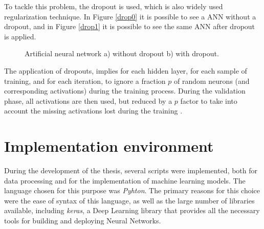To tackle this problem, the dropout is used, which is also widely used regularization technique. In Figure \ref{drop0} it is possible to see a \ac{ANN} without a dropout, and in Figure \ref{drop1} it is possible to see the same \ac{ANN} after dropout is applied.

\begin{figure}[h!]
\captionsetup[subfigure]{position=b}
\centering
\label{fig:drop}
\hspace{0.05\textwidth}
\caption{Artificial neural network a) without dropout b) with dropout.}
\end{figure}

The application of dropouts, implies for each hidden layer, for each sample of training, and for each iteration, to ignore a fraction $p$ of random neurons (and corresponding activations) during the training process. During the validation phase, all activations are then used, but reduced by a $p$ factor to take into account the missing activations lost during the training \cite{drop0}.

\section{Implementation environment}\label{chap3:sec:implementation_enviromnet}

During the development of the thesis, several scripts were implemented, both for data processing and for the implementation of machine learning models. The language chosen for this purpose was \textit{Pyhton}. The primary reasons for this choice were the ease of syntax of this language, as well as the large number of libraries available, including \textit{keras}, a Deep Learning library that provides all the necessary tools for building and deploying Neural Networks.

